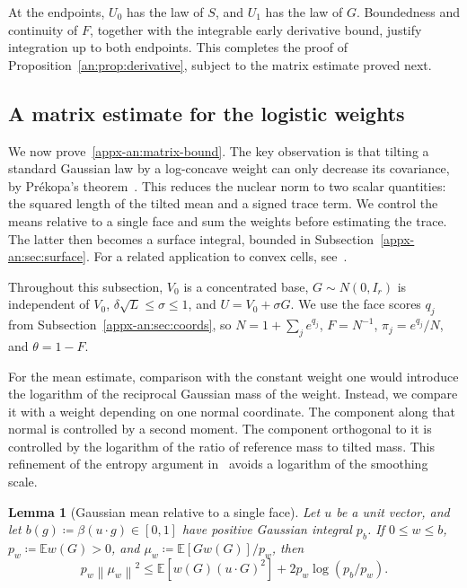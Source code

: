 \documentclass[11pt,letterpaper]{article}
\newtheorem{lemma}{Lemma}
\theoremstyle{remark}
\newcommand{\E}{\mathbb E}
\newcommand{\norm}[1]{\left\lVert#1\right\rVert}
\begin{document}
At the endpoints, \(U_0\) has the law of \(S\), and
\(U_1\) has the law of \(G\). Boundedness and continuity
of \(F\), together with the integrable early derivative bound,
justify integration up to both endpoints. This completes the proof
of Proposition~\ref{an:prop:derivative}, subject to the matrix
estimate proved next.

\subsection{A matrix estimate for the logistic weights}
\label{appx-an:sec:matrix}

We now prove~\eqref{appx-an:matrix-bound}. The key observation is that
tilting a standard Gaussian law by a log-concave weight can only
decrease its covariance, by Pr\'ekopa's
theorem~\cite[Theorem~6]{Prekopa1973}. This reduces the nuclear norm to two scalar
quantities: the squared length of the tilted mean and a signed trace
term. We control the means relative to a single face and sum the
weights before estimating the trace. The latter then becomes a
surface integral, bounded in Subsection~\ref{appx-an:sec:surface}.
For a related application to convex cells,
see~\cite[Lemma~12]{GaoZhang}.

Throughout this subsection, \(V_0\) is a concentrated base,
\(G\sim N(0,I_r)\) is independent of \(V_0\),
\(\delta\sqrt L\le\sigma\le1\), and \(U=V_0+\sigma G\).
We use the face scores \(q_j\) from
Subsection~\ref{appx-an:sec:coords}, so
\(N=1+\sum_j e^{q_j}\), \(F=N^{-1}\),
\(\pi_j=e^{q_j}/N\), and \(\theta=1-F\).

For the mean estimate, comparison with the constant weight one would
introduce the logarithm of the reciprocal Gaussian mass of the weight.
Instead, we compare it with a weight depending on one normal coordinate.
The component along that normal is controlled by a second moment.
The component orthogonal to it is controlled by the logarithm of the
ratio of reference mass to tilted mass. This refinement of the entropy argument
in~\cite[Lemma~12]{GaoZhang} avoids a logarithm of the smoothing scale.

\begin{lemma}[Gaussian mean relative to a single face]
\label{appx-an:lem:mean}
Let \(u\) be a unit vector, and let \(b(g)\coloneqq \beta(u\cdot g)\in[0,1]\) have
positive Gaussian integral \(p_b\). If \(0\le w\le b\),
\(p_w\coloneqq \E w(G)>0\), and \(\mu_w\coloneqq \E[Gw(G)]/p_w\), then
\begin{equation}
 p_w\norm{\mu_w}^2
 \le \E[w(G)(u\cdot G)^2]
        +2p_w\log(p_b/p_w).
 \label{appx-an:mean-entropy}
\end{equation}
\end{lemma}
\end{document}
